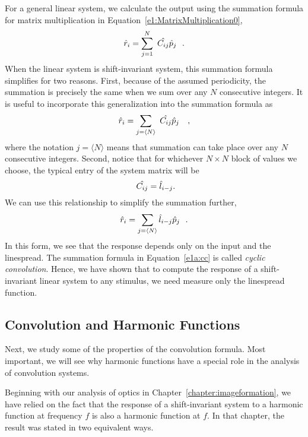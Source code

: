 For a general linear system, we calculate the output using the
summation formula for matrix multiplication in
Equation~\ref{e1:MatrixMultiplication0},
\begin{equation}
\mbox {$\hat{r}_{i}$} = \sum_{j = 1}^{N} \mbox{ $\hat{{C_{ij}}}$} \mbox{$\hat{p}_{j}$} ~~.
\end{equation}
When the linear system is shift-invariant system, this summation
formula simplifies for two reasons.  First, because of the assumed
periodicity, the summation is precisely the same when we sum over any
$N$ consecutive integers.  It is useful to incorporate this
generalization into the summation formula as
\begin{equation}
\label{ea1:ccn}
\mbox {$\hat{r}_{i}$} = \sum_{j = \langle N \rangle} \mbox{ $\hat{{C_{ij}}}$} \mbox{$\hat{p}_{j}$} ~~~,
\end{equation}
where the notation $j = \langle N \rangle$ means that summation can
take place over any $N$ consecutive integers.  Second, notice that for
whichever $N \times N$ block of values we choose, the typical entry of
the system matrix will be
\begin{equation}
\label{e1a:cycconv}
\mbox{ $\hat{{C_{ij}}}$} = \mbox {$\hat{l}_{i-j}$} .
\end{equation}
We can use this relationship to simplify the summation further,
\begin{equation}
\label{e1a:cc}
\mbox {$\hat{r}_{i}$} = \sum_{j = \langle N \rangle} \mbox {$\hat{l}_{i-j}$} \mbox{$\hat{p}_{j}$} ~~.
\end{equation}
In this form, we see that the response depends only on the input and
the linespread.  The summation formula in Equation~\ref{e1a:cc} is
called {\em cyclic convolution}.  Hence, we have shown that to compute
the response of a shift-invariant linear system to any stimulus, we
need measure only the linespread function.

\subsection*{Convolution and Harmonic Functions}
Next, we study some of the properties of the convolution formula.
Most important, we will see why harmonic functions have a special role
in the analysis of convolution systems.

Beginning with our analysis of optics in
Chapter~\ref{chapter:imageformation}, we have relied on the fact that
the response of a shift-invariant system to a harmonic function at
frequency $f$ is also a harmonic function at $f$.  In that chapter,
the result was stated in two equivalent ways.

